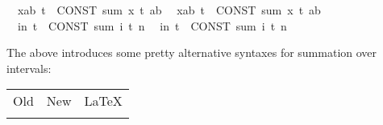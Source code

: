 \begin{isabellebody}
\isanewline
{}\isamarkupfalse%
\isanewline
\ \ {\isachardoublequoteopen}{\isasymSum}x{\isacharequal}{\kern0pt}a{\isachardot}{\kern0pt}{\isachardot}{\kern0pt}b{\isachardot}{\kern0pt}\ t{\isachardoublequoteclose}\ {\isacharequal}{\kern0pt}{\isacharequal}{\kern0pt}\ {\isachardoublequoteopen}CONST\ sum\ {\isacharparenleft}{\kern0pt}{\isasymlambda}x{\isachardot}{\kern0pt}\ t{\isacharparenright}{\kern0pt}\ {\isacharbraceleft}{\kern0pt}a{\isachardot}{\kern0pt}{\isachardot}{\kern0pt}b{\isacharbraceright}{\kern0pt}{\isachardoublequoteclose}\isanewline
\ \ {\isachardoublequoteopen}{\isasymSum}x{\isacharequal}{\kern0pt}a{\isachardot}{\kern0pt}{\isachardot}{\kern0pt}{\isacharless}{\kern0pt}b{\isachardot}{\kern0pt}\ t{\isachardoublequoteclose}\ {\isacharequal}{\kern0pt}{\isacharequal}{\kern0pt}\ {\isachardoublequoteopen}CONST\ sum\ {\isacharparenleft}{\kern0pt}{\isasymlambda}x{\isachardot}{\kern0pt}\ t{\isacharparenright}{\kern0pt}\ {\isacharbraceleft}{\kern0pt}a{\isachardot}{\kern0pt}{\isachardot}{\kern0pt}{\isacharless}{\kern0pt}b{\isacharbraceright}{\kern0pt}{\isachardoublequoteclose}\isanewline
\ \ {\isachardoublequoteopen}{\isasymSum}i{\isasymle}n{\isachardot}{\kern0pt}\ t{\isachardoublequoteclose}\ {\isacharequal}{\kern0pt}{\isacharequal}{\kern0pt}\ {\isachardoublequoteopen}CONST\ sum\ {\isacharparenleft}{\kern0pt}{\isasymlambda}i{\isachardot}{\kern0pt}\ t{\isacharparenright}{\kern0pt}\ {\isacharbraceleft}{\kern0pt}{\isachardot}{\kern0pt}{\isachardot}{\kern0pt}n{\isacharbraceright}{\kern0pt}{\isachardoublequoteclose}\isanewline
\ \ {\isachardoublequoteopen}{\isasymSum}i{\isacharless}{\kern0pt}n{\isachardot}{\kern0pt}\ t{\isachardoublequoteclose}\ {\isacharequal}{\kern0pt}{\isacharequal}{\kern0pt}\ {\isachardoublequoteopen}CONST\ sum\ {\isacharparenleft}{\kern0pt}{\isasymlambda}i{\isachardot}{\kern0pt}\ t{\isacharparenright}{\kern0pt}\ {\isacharbraceleft}{\kern0pt}{\isachardot}{\kern0pt}{\isachardot}{\kern0pt}{\isacharless}{\kern0pt}n{\isacharbraceright}{\kern0pt}{\isachardoublequoteclose}%
\begin{isamarkuptext}%
The above introduces some pretty alternative syntaxes for
summation over intervals:
\begin{center}
\begin{tabular}{lll}
Old & New & \LaTeX\\
\isa{{\isachardoublequote}{\kern0pt}{\isasymSum}x{\isasymin}{\isacharbraceleft}{\kern0pt}a{\isachardot}{\kern0pt}{\isachardot}{\kern0pt}b{\isacharbraceright}{\kern0pt}{\isachardot}{\kern0pt}\ e{\isachardoublequote}{\kern0pt}} & \isa{{\isasymSum}x\ {\isacharequal}{\kern0pt}\ a{\isachardot}{\kern0pt}{\isachardot}{\kern0pt}b{\isachardot}{\kern0pt}\ e} & \isa{$\sum_{x\ {\isacharequal}{\kern0pt}\ a}^{b}$\ e}\\

\end{tabular}
\end{center}
\end{isamarkuptext}
\end{isabellebody}
